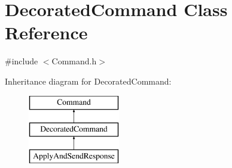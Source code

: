 \hypertarget{class_decorated_command}{}\section{Decorated\+Command Class Reference}
\label{class_decorated_command}


{\ttfamily \#include $<$Command.\+h$>$}

Inheritance diagram for Decorated\+Command\+:\begin{figure}[H]
\begin{center}
\leavevmode
\includegraphics[height=3.000000cm]{class_decorated_command}
\end{center}
\end{figure}
